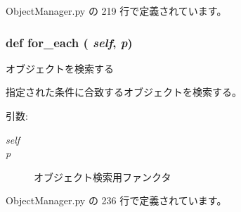 ObjectManager.py の 219 行で定義されています。
\subsubsection{\setlength{\rightskip}{0pt plus 5cm}def for\_\-each ( {\em self},  {\em p})}\label{classsource__py_1_1_object_manager_1_1_object_manager_d61817a49140809dca8bddb70c9c311c}


オブジェクトを検索する 

指定された条件に合致するオブジェクトを検索する。

\begin{Desc}
\item[引数:]
\begin{description}
\item[{\em self}]\item[{\em p}]オブジェクト検索用ファンクタ \end{description}
\end{Desc}


 ObjectManager.py の 236 行で定義されています。